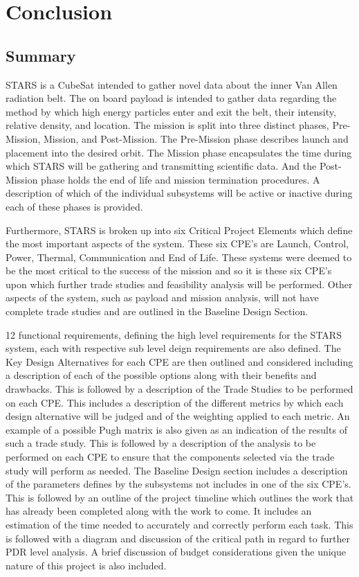 
\section{Conclusion}
\subsection{Summary}

STARS is a CubeSat intended to gather novel data about the inner Van Allen radiation belt. The on board payload is intended to gather data regarding the method by which high energy particles enter and exit the belt, their intensity, relative density, and location. The mission is split into three distinct phases, Pre-Mission, Mission, and Post-Mission. The Pre-Mission phase describes launch and placement into the desired orbit. The Mission phase encapsulates the time during which STARS will be gathering and transmitting scientific data. And the Post-Mission phase holds the end of life and mission termination procedures. A description of which of the individual subsystems will be active or inactive during each of these phases is provided.

Furthermore, STARS is broken up into six Critical Project Elements which define the most important aspects of the system. These six CPE's are Launch, Control, Power, Thermal, Communication and End of Life. These systems were deemed to be the most critical to the success of the mission and so it is these six CPE's upon which further trade studies and feasibility analysis will be performed.  Other aspects of the system, such as payload and mission analysis, will not have complete trade studies and are outlined in the Baseline Design Section.

12 functional requirements, defining the high level requirements for the STARS system, each with respective sub level deign requirements are also defined. The Key Design Alternatives for each CPE are then outlined and considered including a description of each of the possible options along with their benefits and drawbacks. This is followed by a description of the Trade Studies to be performed on each CPE. This includes a description of the different metrics by which each design alternative will be judged and of the weighting applied to each metric. An example of a possible Pugh matrix is also given as an indication of the results of such a trade study. This is followed by a description of the analysis to be performed on each CPE to ensure that the components selected via the trade study will perform as needed. The Baseline Design section includes a description of the parameters defines by the subsystems not includes in one of the six CPE's. This is followed by an outline of the project timeline which outlines the work that has already been completed along with the work to come. It includes an estimation of the time needed to accurately and correctly perform each task. This is followed with a diagram and discussion of the critical path in regard to further PDR level analysis. A brief discussion of budget considerations given the unique nature of this project is also included. 

